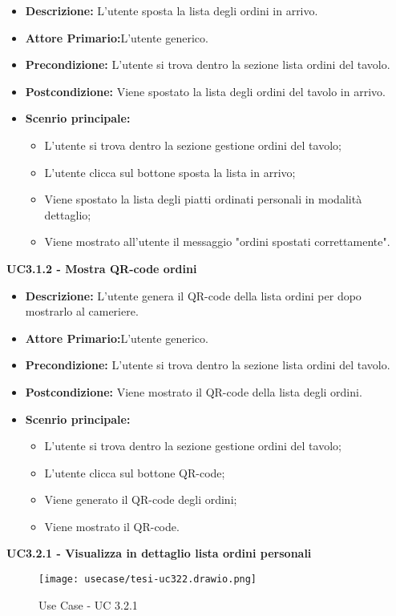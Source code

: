 \begin{itemize}
    \item \textbf{Descrizione:} L'utente sposta la lista degli ordini in arrivo.
    \item \textbf{Attore Primario:}L'utente generico.
    \item \textbf{Precondizione:} L'utente si trova dentro la sezione lista ordini del tavolo.
    \item \textbf{Postcondizione:} Viene spostato la lista degli ordini del tavolo in arrivo.
    \item \textbf{Scenrio principale:}
    \begin{itemize}
        \item L'utente si trova dentro la sezione gestione ordini del tavolo;
        \item L'utente clicca sul bottone sposta la lista in arrivo;
        \item Viene spostato la lista degli piatti ordinati personali in modalità dettaglio;
        \item Viene mostrato all'utente il messaggio "ordini spostati correttamente".
    \end{itemize}
\end{itemize}
\textbf{UC3.1.2 - Mostra QR-code ordini}
\begin{itemize}
    \item \textbf{Descrizione:} L'utente genera il QR-code della lista ordini per dopo mostrarlo al cameriere.
    \item \textbf{Attore Primario:}L'utente generico.
    \item \textbf{Precondizione:} L'utente si trova dentro la sezione lista ordini del tavolo.
    \item \textbf{Postcondizione:} Viene mostrato il QR-code della lista degli ordini.
    \item \textbf{Scenrio principale:}
    \begin{itemize}
        \item L'utente si trova dentro la sezione gestione ordini del tavolo;
        \item L'utente clicca sul bottone QR-code;
        \item Viene generato il QR-code degli ordini;
        \item Viene mostrato il QR-code.
    \end{itemize}
\end{itemize}
\textbf{UC3.2.1 - Visualizza in dettaglio lista ordini personali}
\begin{figure}[H]
    \centering
    \texttt{[image: usecase/tesi-uc322.drawio.png]}
    \caption{Use Case - UC 3.2.1}
\end{figure}
